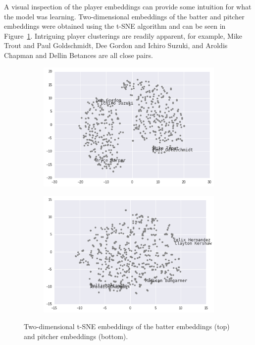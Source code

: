 \documentclass{article}
\begin{document}
A visual inspection of the player embeddings can provide some intuition for what the model was learning. Two-dimensional embeddings of the batter and pitcher embeddings were obtained using the t-SNE algorithm \parencite{VanderMaaten2008} and can be seen in Figure~\ref{fig:tsne}. Intriguing player clusterings are readily apparent, for example, Mike Trout and Paul Goldschmidt, Dee Gordon and Ichiro Suzuki, and Aroldis Chapman and Dellin Betances are all close pairs.

\begin{figure}
\captionsetup[subfigure]{labelformat=empty}
\centering

    \begin{subfigure}[b]{0.75\textwidth}
    \includegraphics[width=1\linewidth]{batter_tsne.png}
    \caption{}
    \end{subfigure}

    \begin{subfigure}[b]{0.75\textwidth}
    \includegraphics[width=1\linewidth]{pitcher_tsne.png}
    \caption{}
    \end{subfigure}

\caption{Two-dimensional t-SNE embeddings of the batter embeddings (top) and pitcher embeddings (bottom).}
\label{fig:tsne}
\end{figure}
\end{document}
